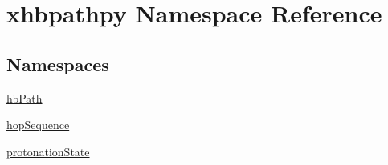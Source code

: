 \hypertarget{namespacexhbpathpy}{\section{xhbpathpy Namespace Reference}
\label{namespacexhbpathpy}
}
\subsection*{Namespaces}
\begin{DoxyCompactItemize}
\item 
\hyperlink{namespacexhbpathpy_1_1hb_path}{hb\-Path}
\item 
\hyperlink{namespacexhbpathpy_1_1hop_sequence}{hop\-Sequence}
\item 
\hyperlink{namespacexhbpathpy_1_1protonation_state}{protonation\-State}
\end{DoxyCompactItemize}
